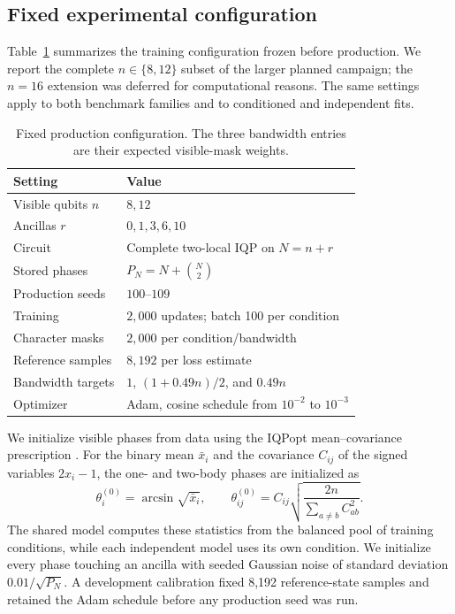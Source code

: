 \documentclass[pra,aps,10pt,twocolumn,floatfix,superscriptaddress,
notitlepage,longbibliography]{revtex4-2}
\begin{document}
\subsection{Fixed experimental configuration}

Table~\ref{tab:fixed-configuration} summarizes the training configuration frozen before production. We report the complete $n\in\{8,12\}$ subset of the larger planned campaign; the $n=16$ extension was deferred for computational reasons. The same settings apply to both benchmark families and to conditioned and independent fits.
\begin{table}[tb]
    \caption{Fixed production configuration. The three bandwidth entries are their expected visible-mask weights.}
    \label{tab:fixed-configuration}
    \centering
    \footnotesize
    \begin{tabular}{@{}ll@{}}
        \toprule
        Setting & Value \\
        \midrule
        Visible qubits $n$ & $8,12$ \\
        Ancillas $r$ & $0,1,3,6,10$ \\
        Circuit & Complete two-local IQP on $N=n+r$ \\
        Stored phases & $P_N=N+\binom{N}{2}$ \\
        Production seeds & $100$--$109$ \\
        Training & $2{,}000$ updates; batch 100 per condition \\
        Character masks & $2{,}000$ per condition/bandwidth \\
        Reference samples & $8{,}192$ per loss estimate \\
        Bandwidth targets & $1$, $(1+0.49n)/2$, and $0.49n$ \\
        Optimizer & Adam, cosine schedule from $10^{-2}$ to $10^{-3}$ \\
        \bottomrule
    \end{tabular}
\end{table}

We initialize visible phases from data using the IQPopt mean--covariance prescription \cite{recio-armengolIQPoptFastOptimization2025}. For the binary mean $\bar{x}_i$ and the covariance $C_{ij}$ of the signed variables $2x_i-1$, the one- and two-body phases are initialized as
\begin{equation}
    \theta_i^{(0)}=\arcsin\sqrt{\bar{x}_i},
    \qquad
    \theta_{ij}^{(0)}=C_{ij}\sqrt{\frac{2n}{\sum_{a\ne b}C_{ab}^2}}.
    \label{eq:data-initialization}
\end{equation}
The shared model computes these statistics from the balanced pool of training conditions, while each independent model uses its own condition. We initialize every phase touching an ancilla with seeded Gaussian noise of standard deviation $0.01/\sqrt{P_N}$. A development calibration fixed 8,192 reference-state samples and retained the Adam schedule before any production seed was run.
\end{document}
